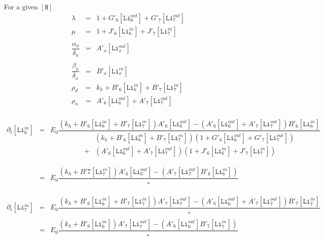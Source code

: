 \documentclass[aps,onecolumn,11pt]{revtex4}
\newcommand{\mychem}[1]{\mathtt{#1}}
\newcommand{\myconc}[1]{\left\lbrack{#1}\right\rbrack}
\newcommand{\LiIn}[1]{\myconc{\mychem{Li}_{#1}^{in}}}
\newcommand{\LiOut}[1]{\myconc{\mychem{Li}_{#1}^{out}}}
\newcommand{\Hin}{\myconc{\mychem{H}}}
\begin{document}
For a given $\Hin$
\begin{equation}
	\begin{array}{rcl}
	\lambda & = & 1 + G'_6 \LiOut{6} + G'_7 \LiOut{7} \\
	\mu     & = & 1 + J'_6 \LiIn{6} + J'_7 \LiIn{7} \\
	\\
	\dfrac{\alpha_x}{\delta_x} & = & A'_x \LiOut{x}\\
	\\
	\dfrac{\beta_x}{\delta_x}  & = & B'_x \LiIn{x}\\
	\rho_d & = & k_h + B'_6 \LiIn{6} + B'_7 \LiIn{7}\\
	\rho_n & = & A'_6 \LiOut{6} + A'_7 \LiOut{7}\\
	\end{array}
\end{equation}

\begin{equation}
	\begin{array}{rcl}
	\partial_t \LiIn{6} & = &E_0
	\dfrac{
	 \left(k_h + B'_6 \LiIn{6} + B'_7 \LiIn{7}\right) A'_6 \LiOut{6}
	 -\left(A'_6 \LiOut{6} + A'_7 \LiOut{7}\right) B'_6 \LiIn{6}
	}
	{
	\begin{array}{cl}
	&\left(k_h + B'_6 \LiIn{6} + B'_7 \LiIn{7}\right) \left(1 + G'_6 \LiOut{6} + G'_7 \LiOut{7}\right)\\
	+&\left(A'_6 \LiOut{6} + A'_7 \LiOut{7}\right)\left(1 + J'_6 \LiIn{6} + J'_7 \LiIn{7}\right)\\
	\end{array}
	}
	\\
	\\
	& = & E_0 \dfrac{\left(k_h + B'7\LiIn{7}\right) A'_6 \LiOut{6} - \left(A'_7 \LiOut{7} B'_6 \LiIn{6}\right) }{\square}\\
	\end{array}
\end{equation}

\begin{equation}
	\begin{array}{rcl}
	\partial_t \LiIn{7} & = &E_0
	\dfrac{\left(k_h + B'_6 \LiIn{6} + B'_7 \LiIn{7}\right) A'_7 \LiOut{7}-
	\left(A'_6 \LiOut{6} + A'_7 \LiOut{7}\right) B'_7 \LiIn{7}
	}
	{\square}\\
	\\
	& = & E_0
	\dfrac{\left(k_h + B'_6 \LiIn{6}\right) A'_7 \LiOut{7}
	 -
	 \left(A'_6\LiOut{6}B'_7\LiIn{7}\right) 
	 }
	{\square}
	\end{array}
\end{equation}
\end{document}
